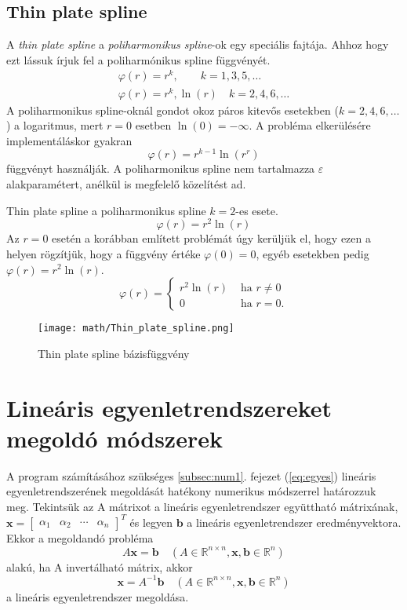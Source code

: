 		\subsection{Thin plate spline}	
			A \textit{thin plate spline} a \textit{poliharmonikus spline}-ok egy speciális fajtája. Ahhoz hogy ezt lássuk írjuk fel a poliharmónikus spline függvényét.
			\begin{gather*}
				\varphi(r) = r^k, \qquad k= 1,3,5,\ldots\\
				\varphi(r) = r^k, \ln(r)\quad k= 2,4,6,\ldots
			\end{gather*}
			A poliharmonikus spline-oknál gondot okoz páros kitevős esetekben ($k=2,4,6,\ldots$) a logaritmus, mert $r=0$ esetben $\ln(0)=-\infty$. A probléma elkerülésére implementáláskor gyakran
			\[\varphi(r)=r^{k-1}\ln(r^r)\]
			függvényt használják.
			A poliharmonikus spline nem tartalmazza $\varepsilon$ alakparamétert, anélkül is megfelelő közelítést ad.
			
			Thin plate spline a poliharmonikus spline $k=2$-es esete. 
			\[\varphi(r) = r^2 \ln(r)\]
			Az $r=0$ esetén a korábban említett problémát úgy kerüljük el, hogy ezen a helyen rögzítjük, hogy a függvény értéke $\varphi(0)=0$, egyéb esetekben pedig $\varphi(r)=r^2\ln(r)$.  
			\[
				\varphi(r) = \begin{cases} 
					r^2 \ln(r) & \text{ ha } r \ne 0 \\
					
					0 & \text{ ha }r=0.
				\end{cases}
			\] 
			\begin{figure}[ht]
				\centering
				\texttt{[image: math/Thin\_plate\_spline.png]}
				\caption{Thin plate spline bázisfüggvény}
			\end{figure} 
		
		\section{Lineáris egyenletrendszereket megoldó módszerek}
		
		A program számításához szükséges \ref{subsec:num1}. fejezet (\ref{eq:egyes}) lineáris egyenletrendszerének megoldását hatékony numerikus módszerrel határozzuk meg. 
		Tekintsük az A mátrixot a lineáris egyenletrendszer együttható mátrixának, $\mathbf{x} =\begin{bmatrix}  \alpha_1 &\alpha_2 &\cdots &\alpha_n \end{bmatrix}^T$ és legyen $\mathbf{b}$ a lineáris egyenletrendszer eredményvektora.
		Ekkor a megoldandó probléma 
		\[
			A\mathbf{x}=\mathbf{b} \quad (A\in \mathbb{R}^{n\times n}, \mathbf{x},\mathbf{b}\in \mathbb{R}^n)
		\]
		alakú, ha A invertálható mátrix, akkor
		\[
			\mathbf{x}=A^{-1}\mathbf{b} \quad (A\in \mathbb{R}^{n\times n}, \mathbf{x},\mathbf{b}\in \mathbb{R}^n)
		\]
		a lineáris egyenletrendszer megoldása.
		
